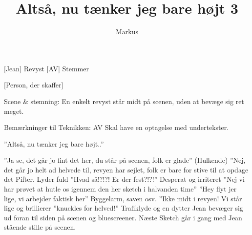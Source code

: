 \documentclass[a4paper,11pt]{article}
\title{Altså, nu tænker jeg bare højt 3}
\author{Markus}
\begin{document}
\maketitle

\begin{roles}
    [Jean] Revyst
    [AV] Stemmer
\end{roles}

\begin{props}
    [Person, der skaffer]
\end{props}

\scene
Scene \& stemning:
En enkelt revyst står midt på scenen, uden at bevæge sig ret meget.

Bemærkninger til Teknikken:
AV Skal have en optagelse med undertekster.

\begin{sketch}

 ”Altså, nu tænker jeg bare højt..”

 ”Ja se, det går jo fint det her, du står på scenen, folk er glade”
 (Hulkende) ”Nej, det går jo helt ad helvede til, revyen har sejlet, folk er bare for stive til at opdage det
 Pifter. Lyder fuld ”Hvad så!?!?! Er der fest?!?!”
 Desperat og irriteret ”Nej vi har prøvet at hutle os igennem den her sketch i halvanden time”
 ”Hey flyt jer lige, vi arbejder faktisk her”
\scene Byggelarm, saven osv.
 ”Ikke midt i revyen! Vi står lige og brillierer
  ”knuckles for helved!”
\scene Trafiklyde og en dytter
\scene Jean bevæger sig ud foran til siden på scenen og bluescreener.
\scene Næste Sketch går i gang med Jean stående stille på scenen.


\end{sketch}
\end{document}
